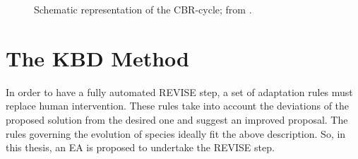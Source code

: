 \begin{figure}[h!]
\begin{minipage}[b]{1\linewidth}
 \centering
\end{minipage}
\caption{Schematic representation of the CBR-cycle; from \cite{aamond_plaza_1994}.} 
\label{cbr}
\end{figure}


\section{The KBD Method}


In order to have a fully automated REVISE step, a set of adaptation rules must replace human intervention. These rules take into account the deviations of the proposed solution from the desired one and suggest an improved proposal. The rules governing the evolution of species ideally fit the above description. So, in this thesis, an EA is proposed to undertake the REVISE step. 

